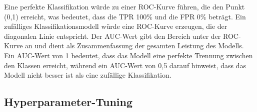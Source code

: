 \documentclass[conference]{IEEEtran}
\begin{document}
\begin{itemize}
    Eine perfekte Klassifikation würde zu einer ROC-Kurve führen, die den Punkt (0,1) erreicht, was bedeutet, dass die TPR 100\% und die FPR 0\% beträgt. Ein zufälliges Klassifikationsmodell würde eine ROC-Kurve erzeugen, die der diagonalen Linie entspricht. Der AUC-Wert gibt den Bereich unter der ROC-Kurve an und dient als Zusammenfassung der gesamten Leistung des Modells. Ein AUC-Wert von 1 bedeutet, dass das Modell eine perfekte Trennung zwischen den Klassen erreicht, während ein AUC-Wert von 0,5 darauf hinweist, dass das Modell nicht besser ist als eine zufällige Klassifikation.
\end{itemize}

\newpage

\subsection{Hyperparameter-Tuning}
\end{document}
